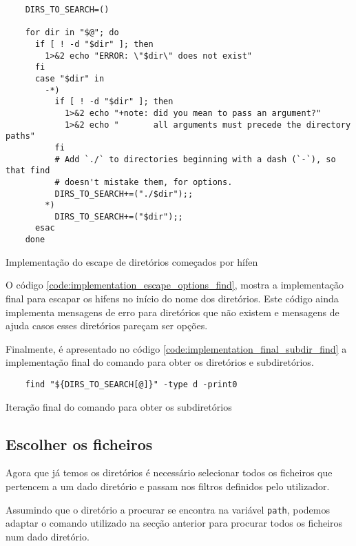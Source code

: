 \begin{listing}[H]
	\centering
	\begin{verbatim}
    DIRS_TO_SEARCH=()

    for dir in "$@"; do
      if [ ! -d "$dir" ]; then
        1>&2 echo "ERROR: \"$dir\" does not exist"
      fi
      case "$dir" in
        -*)
          if [ ! -d "$dir" ]; then
            1>&2 echo "+note: did you mean to pass an argument?"
            1>&2 echo "       all arguments must precede the directory paths"
          fi
          # Add `./` to directories beginning with a dash (`-`), so that find
          # doesn't mistake them, for options.
          DIRS_TO_SEARCH+=("./$dir");;
        *)
          DIRS_TO_SEARCH+=("$dir");;
      esac
    done
  \end{verbatim}
	\caption{Implementação do escape de diretórios começados por hífen}
	\label{code:implementation_escape_options_find}
\end{listing}

O código \ref{code:implementation_escape_options_find}, mostra a implementação
final para escapar os hifens no início do nome dos diretórios. Este código
ainda implementa mensagens de erro para diretórios que não existem e mensagens
de ajuda casos esses diretórios pareçam ser opções.

Finalmente, é apresentado no código \ref{code:implementation_final_subdir_find}
a implementação final do comando para obter os diretórios e subdiretórios.

\begin{listing}[H]
	\centering
	\begin{verbatim}
    find "${DIRS_TO_SEARCH[@]}" -type d -print0
  \end{verbatim}
	\caption{Iteração final do comando para obter os subdiretórios}
	\label{code:implementation_final_subdir_find}
\end{listing}

\subsection{Escolher os ficheiros}\label{sec:implementation_choosing_files}

Agora que já temos os diretórios é necessário selecionar todos os ficheiros que
pertencem a um dado diretório e passam nos filtros definidos pelo utilizador.

Assumindo que o diretório a procurar se encontra na variável \Verb|path|, podemos
adaptar o comando utilizado na secção anterior para procurar todos os ficheiros
num dado diretório.

